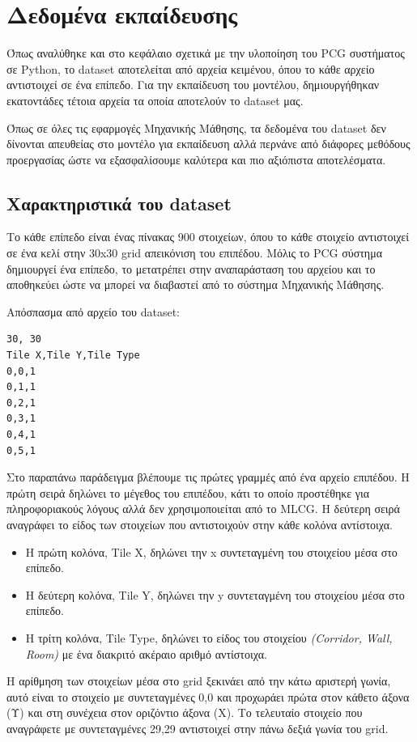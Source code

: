 \section{Δεδομένα εκπαίδευσης}
Όπως αναλύθηκε και στο κεφάλαιο σχετικά με την υλοποίηση του PCG συστήματος σε Python, το dataset αποτελείται από αρχεία κειμένου, όπου το κάθε αρχείο αντιστοιχεί σε ένα επίπεδο. Για την εκπαίδευση του μοντέλου, δημιουργήθηκαν εκατοντάδες τέτοια αρχεία τα οποία αποτελούν το dataset μας.
\par
Όπως σε όλες τις εφαρμογές Μηχανικής Μάθησης, τα δεδομένα του dataset δεν δίνονται απευθείας στο μοντέλο για εκπαίδευση αλλά περνάνε από διάφορες μεθόδους προεργασίας ώστε να εξασφαλίσουμε καλύτερα και πιο αξιόπιστα αποτελέσματα.


\subsection{Χαρακτηριστικά του dataset}
Το κάθε επίπεδο είναι ένας πίνακας 900 στοιχείων, όπου το κάθε στοιχείο αντιστοιχεί σε ένα κελί στην 30x30 grid απεικόνιση του επιπέδου. Μόλις το PCG σύστημα δημιουργεί ένα επίπεδο, το μετατρέπει στην αναπαράσταση του αρχείου και το αποθηκεύει ώστε να μπορεί να διαβαστεί από το σύστημα Μηχανικής Μάθησης.
\par
Απόσπασμα από αρχείο του dataset:
\begin{verbatim}
30, 30
Tile X,Tile Y,Tile Type
0,0,1
0,1,1
0,2,1
0,3,1
0,4,1
0,5,1
\end{verbatim}
Στο παραπάνω παράδειγμα βλέπουμε τις πρώτες γραμμές από ένα αρχείο επιπέδου. Η πρώτη σειρά δηλώνει το μέγεθος του επιπέδου, κάτι το οποίο προστέθηκε για πληροφοριακούς λόγους αλλά δεν χρησιμοποιείται από το MLCG. Η δεύτερη σειρά αναγράφει το είδος των στοιχείων που αντιστοιχούν στην κάθε κολόνα αντίστοιχα.
\par

\begin{itemize}
\item Η πρώτη κολόνα, Tile X, δηλώνει την x συντεταγμένη του στοιχείου μέσα στο επίπεδο.
\item Η δεύτερη κολόνα, Tile Y, δηλώνει την y συντεταγμένη του στοιχείου μέσα στο επίπεδο.
\item Η τρίτη κολόνα, Tile Type, δηλώνει το είδος του στοιχείου \textit{(Corridor, Wall, Room)} με ένα διακριτό ακέραιο αριθμό αντίστοιχα.
\end{itemize}

\par
H αρίθμηση των στοιχείων μέσα στο grid ξεκινάει από την κάτω αριστερή γωνία, αυτό είναι το στοιχείο με συντεταγμένες 0,0 και προχωράει πρώτα στον κάθετο άξονα (Υ) και στη συνέχεια στον οριζόντιο άξονα (Χ). Το τελευταίο στοιχείο που αναγράφετε με συντεταγμένες 29,29 αντιστοιχεί στην πάνω δεξιά γωνία του grid.


